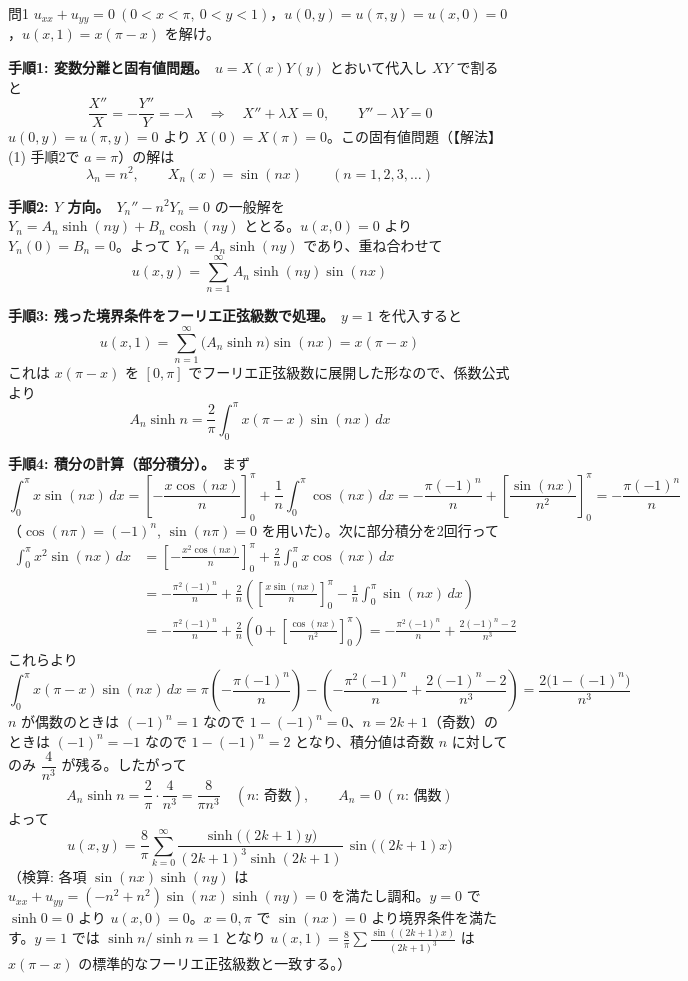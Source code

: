 \documentclass[a4paper,11pt]{article}
\begin{document}
\bigskip

\clearpage
\begin{mondaiboxS}{問1}
$u_{xx} + u_{yy} = 0\ (0 < x < \pi,\ 0 < y < 1)$，$u(0,y) = u(\pi,y) = u(x,0) = 0$，$u(x,1) = x(\pi - x)$ を解け。
\end{mondaiboxS}
\kaitou
\textbf{手順1: 変数分離と固有値問題。}\ $u = X(x)Y(y)$ とおいて代入し $XY$ で割ると
\[
\frac{X''}{X} = -\frac{Y''}{Y} = -\lambda
\quad\Longrightarrow\quad
X'' + \lambda X = 0, \qquad Y'' - \lambda Y = 0
\]
$u(0,y) = u(\pi,y) = 0$ より $X(0) = X(\pi) = 0$。この固有値問題（【解法】(1) 手順2で $a = \pi$）の解は
\[
\lambda_n = n^2, \qquad X_n(x) = \sin(nx) \qquad (n = 1, 2, 3, \dots)
\]

\textbf{手順2: $Y$ 方向。}\ $Y_n'' - n^2 Y_n = 0$ の一般解を $Y_n = A_n\sinh(ny) + B_n\cosh(ny)$ ととる。$u(x,0) = 0$ より $Y_n(0) = B_n = 0$。よって $Y_n = A_n\sinh(ny)$ であり、重ね合わせて
\[
u(x,y) = \sum_{n=1}^{\infty} A_n \sinh(ny)\sin(nx)
\]

\textbf{手順3: 残った境界条件をフーリエ正弦級数で処理。}\ $y=1$ を代入すると
\[
u(x,1) = \sum_{n=1}^{\infty} \bigl(A_n \sinh n\bigr)\sin(nx) = x(\pi - x)
\]
これは $x(\pi-x)$ を $[0,\pi]$ でフーリエ正弦級数に展開した形なので、係数公式より
\[
A_n \sinh n = \frac{2}{\pi}\int_0^{\pi} x(\pi - x)\sin(nx)\,dx
\]

\textbf{手順4: 積分の計算（部分積分）。}\ まず
\[
\int_0^\pi x\sin(nx)\,dx
= \left[-\frac{x\cos(nx)}{n}\right]_0^\pi + \frac{1}{n}\int_0^\pi \cos(nx)\,dx
= -\frac{\pi(-1)^n}{n} + \left[\frac{\sin(nx)}{n^2}\right]_0^\pi
= -\frac{\pi(-1)^n}{n}
\]
（$\cos(n\pi) = (-1)^n$, $\sin(n\pi) = 0$ を用いた）。次に部分積分を2回行って
\begin{align*}
\int_0^\pi x^2\sin(nx)\,dx
&= \left[-\frac{x^2\cos(nx)}{n}\right]_0^\pi + \frac{2}{n}\int_0^\pi x\cos(nx)\,dx \\
&= -\frac{\pi^2(-1)^n}{n} + \frac{2}{n}\left(\left[\frac{x\sin(nx)}{n}\right]_0^\pi - \frac{1}{n}\int_0^\pi \sin(nx)\,dx\right) \\
&= -\frac{\pi^2(-1)^n}{n} + \frac{2}{n}\left(0 + \left[\frac{\cos(nx)}{n^2}\right]_0^\pi\right)
= -\frac{\pi^2(-1)^n}{n} + \frac{2(-1)^n - 2}{n^3}
\end{align*}
これらより
\[
\int_0^\pi x(\pi-x)\sin(nx)\,dx
= \pi\left(-\frac{\pi(-1)^n}{n}\right) - \left(-\frac{\pi^2(-1)^n}{n} + \frac{2(-1)^n-2}{n^3}\right)
= \frac{2\bigl(1-(-1)^n\bigr)}{n^3}
\]
$n$ が偶数のときは $(-1)^n = 1$ なので $1 - (-1)^n = 0$、$n = 2k+1$（奇数）のときは $(-1)^n = -1$ なので $1 - (-1)^n = 2$ となり、積分値は奇数 $n$ に対してのみ $\dfrac{4}{n^3}$ が残る。したがって
\[
A_n \sinh n = \frac{2}{\pi}\cdot\frac{4}{n^3} = \frac{8}{\pi n^3} \quad (n\text{: 奇数}), \qquad A_n = 0\ (n\text{: 偶数})
\]
よって
\[
\boxed{\;
u(x,y) = \frac{8}{\pi}\sum_{k=0}^{\infty} \frac{\sinh\bigl((2k+1)y\bigr)}{(2k+1)^{3}\sinh(2k+1)}\,\sin\bigl((2k+1)x\bigr)
\;}
\]
（検算: 各項 $\sin(nx)\sinh(ny)$ は $u_{xx}+u_{yy} = (-n^2+n^2)\sin(nx)\sinh(ny) = 0$ を満たし調和。$y=0$ で $\sinh 0 = 0$ より $u(x,0)=0$。$x=0,\pi$ で $\sin(nx)=0$ より境界条件を満たす。$y=1$ では $\sinh n/\sinh n = 1$ となり $u(x,1) = \frac{8}{\pi}\sum \frac{\sin((2k+1)x)}{(2k+1)^3}$ は $x(\pi-x)$ の標準的なフーリエ正弦級数と一致する。）
\end{document}
